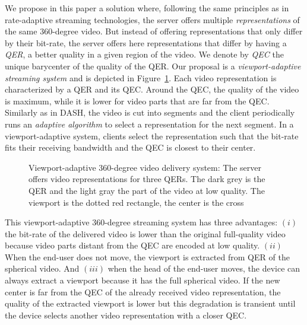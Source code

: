 We propose in this paper a solution where, following the same
principles as in rate-adaptive streaming technologies, the server
offers multiple \emph{representations} of the same $360$-degree video.
But instead of offering representations that only differ by their
bit-rate, the server offers here representations that differ by having a \emph{\ac{QER}},
a better quality in a given region of the video.
We denote by \emph{\ac{QEC}} the unique barycenter of the quality of the \ac{QER}.
Our proposal is a
\emph{viewport-adaptive streaming system} and is depicted in
Figure~\ref{fig:deliverychain}. Each video representation is characterized
by a \ac{QER} and its \ac{QEC}. Around the \ac{QEC}, the quality of the video is
maximum, while it is lower for video parts that are far from the
\ac{QEC}. Similarly as in \ac{DASH}, the video is cut into segments
and the client periodically runs an \emph{adaptive algorithm} to
select a representation for the next segment. In a
viewport-adaptive system, clients select the representation
such that the bit-rate fits their receiving
bandwidth and the \ac{QEC} is closest to their \FoV{} center.

\begin{figure}
   \centering
   
   \caption{Viewport-adaptive 360-degree video delivery system: The server
   offers video representations for three \acp{QER}. The dark grey is the \ac{QER} and the light
   gray the part of the video at low quality. The viewport is the dotted red rectangle, the \FoV{} center is the cross}
   \label{fig:deliverychain}
\end{figure}

This viewport-adaptive $360$-degree streaming system has three
advantages: $(i)$ the bit-rate of the delivered video is lower than
the original full-quality video because video parts distant from the
\ac{QEC} are encoded at low quality. $(ii)$ When the end-user does not
move, the viewport is extracted from \ac{QER} of the
spherical video. And $(iii)$ when the head of the end-user moves, the
device can always extract a viewport because it has the full
spherical video. If the new \FoV{} center is far from the \ac{QEC}
of the already received video representation, the quality of the
extracted viewport is lower but this degradation is transient until the
device selects another video representation with a closer \ac{QEC}.

